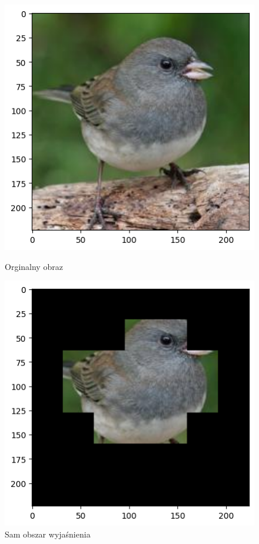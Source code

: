 \begin{figure}
	\begin{minipage}[b]{0.45\textwidth}
		\centering\includegraphics[width=.9\textwidth]{img/parameters/quality/base}
		\caption{Orginalny obraz}  \label{rys:parameters_lime_numsamples_1000}
	\end{minipage}
	\begin{minipage}[b]{0.45\textwidth}
		\centering\includegraphics[width=.9\textwidth]{img/parameters/quality/mask}
		\caption{Sam obszar wyjaśnienia}  \label{rys:parameters_lime_numsamples_1000}
	\end{minipage}
\end{figure}

